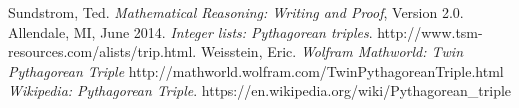 \documentclass[letterpaper,12pt]{article}
\theoremstyle{definition}
\begin{document}
\begin{thebibliography}{9}
  Sundstrom, Ted. \textit{Mathematical Reasoning: Writing and Proof}, Version 2.0. Allendale, MI, June 2014.
  \textit{Integer lists: Pythagorean triples}. http://www.tsm-resources.com/alists/trip.html.
  Weisstein, Eric. \textit{Wolfram Mathworld: Twin Pythagorean Triple} http://mathworld.wolfram.com/TwinPythagoreanTriple.html
  \textit{Wikipedia: Pythagorean Triple}. https://en.wikipedia.org/wiki/Pythagorean\_triple
\end{thebibliography}
\end{document}
